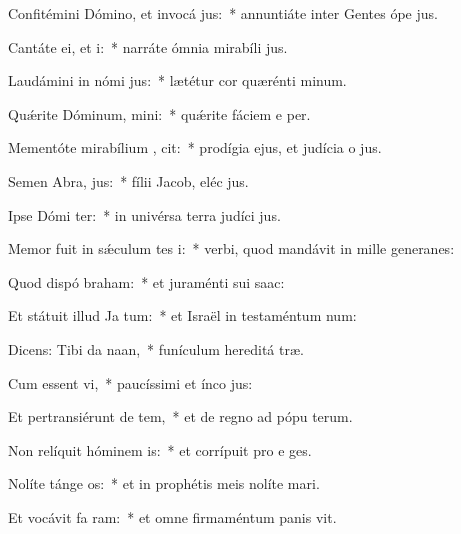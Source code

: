 \item Confitémini Dómino, et invocá  jus:~* annuntiáte inter Gentes ópe jus.
\item Cantáte ei, et  i:~* narráte ómnia mirabíli jus.
\item Laudámini in nómi  jus:~* lætétur cor quærénti minum.
\item Quǽrite Dóminum,  mini:~* quǽrite fáciem e per.
\item Mementóte mirabílium ,  cit:~* prodígia ejus, et judícia o jus.
\item Semen Abra,  jus:~* fílii Jacob, eléc jus.
\item Ipse Dómi  ter:~* in univérsa terra judíci jus.
\item Memor fuit in sǽculum tes i:~* verbi, quod mandávit in mille generanes:
\item Quod dispó  braham:~* et juraménti sui  saac:
\item Et státuit illud Ja  tum:~* et Israël in testaméntum num:
\item Dicens: Tibi da  naan,~* funículum hereditá træ.
\item Cum essent  vi,~* paucíssimi et ínco jus:
\item Et pertransiérunt de   tem,~* et de regno ad pópu terum.
\item Non relíquit hóminem  is:~* et corrípuit pro e ges.
\item Nolíte tánge  os:~* et in prophétis meis nolíte mari.
\item Et vocávit fa  ram:~* et omne firmaméntum panis vit.
